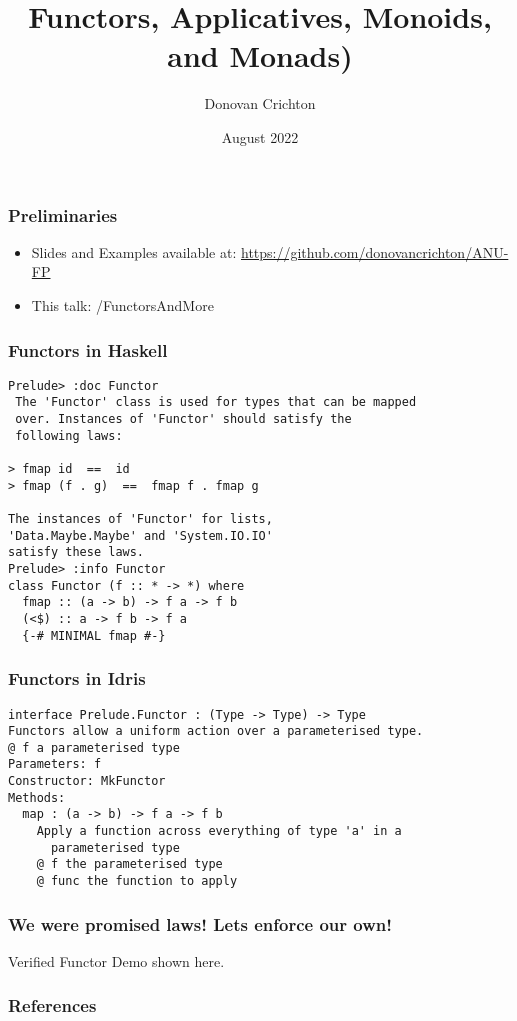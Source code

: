 \documentclass[hyperref={colorlinks = true,linkcolor = blue, citecolor = blue, urlcolor = blue}]{beamer}
\title{Functors, Applicatives, Monoids, and Monads)}
\author{Donovan Crichton}
\date{August 2022}
\begin{document}
 
\frame{\titlepage}

\begin{frame}[fragile]
  \frametitle{Preliminaries}
  \begin{itemize}
  \item Slides and Examples available at:
    \url{https://github.com/donovancrichton/ANU-FP}
  \item This talk: /FunctorsAndMore
  \end{itemize}
\end{frame}

\begin{frame}[fragile]
  \frametitle{Functors in Haskell}
  \begin{verbatim}
Prelude> :doc Functor
 The 'Functor' class is used for types that can be mapped 
 over. Instances of 'Functor' should satisfy the 
 following laws:

> fmap id  ==  id
> fmap (f . g)  ==  fmap f . fmap g

The instances of 'Functor' for lists, 
'Data.Maybe.Maybe' and 'System.IO.IO'
satisfy these laws.
Prelude> :info Functor
class Functor (f :: * -> *) where
  fmap :: (a -> b) -> f a -> f b
  (<$) :: a -> f b -> f a
  {-# MINIMAL fmap #-}
  \end{verbatim}
\end{frame}

\begin{frame}[fragile]
  \frametitle{Functors in Idris}
  \begin{verbatim}
interface Prelude.Functor : (Type -> Type) -> Type
Functors allow a uniform action over a parameterised type.
@ f a parameterised type
Parameters: f
Constructor: MkFunctor
Methods:
  map : (a -> b) -> f a -> f b
    Apply a function across everything of type 'a' in a 
      parameterised type
    @ f the parameterised type
    @ func the function to apply
  \end{verbatim}
\end{frame}

\begin{frame}[fragile]
  \frametitle{We were promised laws! Lets enforce our own!}
  Verified Functor Demo shown here.
\end{frame}

\begin{frame}[fragile]
\frametitle{References}
{}
\end{frame}
\end{document}
